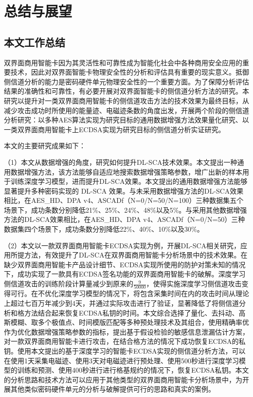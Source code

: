 \chapter{总结与展望}\label{chap:conclusion}{
	\section{本文工作总结}
	双界面商用智能卡因为其灵活性和可靠性成为智能化社会中各种商用安全应用的重要技术，因此对双界面智能卡物理安全性的分析和评估具有重要的现实意义。抵御侧信道分析的能力是密码硬件单元物理安全性的一个重要方面。为了保障分析评估结果的准确性和可靠性，有必要开展对双界面智能卡的侧信道分析方法的研究。本研究以提升对一类双界面商用智能卡的侧信道攻击方法的技术效果为最终目标，从减少攻击成功时所使用的能量迹、电磁迹条数的角度出发，开展两个阶段的侧信道分析研究：以多种AES算法实现为研究目标的通用数据增强方法效果量化研究、以一类双界面商用智能卡上ECDSA实现为研究目标的侧信道分析实证研究。
	
	本文的主要研究成果如下：
	
	（1）本文从数据增强的角度，研究如何提升DL-SCA技术效果。本文提出一种通用数据增强方法，该方法能够自适应地搜索数据增强策略参数，增广出新的样本用于训练深度学习模型，进而提升DL-SCA效果。本文提出的通用数据增强方法能够显著提升多种密码实现的 DL-SCA 效果。与未采用数据增强方法的DL-SCA效果相比，在AES\_HD、DPA v4、ASCADf（N=0/N=50/N=100）三种数据集五个场景下，成功条数分别降低21\%、25\%、24\%、48\%以及5\%。与采用其他数据增强方法的DL-SCA效果相比，在AES\_HD、DPA v4、ASCADf（N=0/N=50）三种数据集四个场景下，成功条数分别降低22\%、40\%、10\%以及30\%。
	
	（2）本文以一款双界面商用智能卡ECDSA实现为例，开展DL-SCA相关研究，应用所提方法，有效提升了DL-SCA在双界面商用智能卡分析场景中的技术效果。在缺少双界面商用智能卡产品设计细节、ECDSA实现所使用的防护对策未知的情况下，成功实现了一款具有ECDSA签名功能的双界面商用智能卡的破解。深度学习侧信道攻击的训练阶段计算量减少到原来的$\frac{9}{50000}$，使得实施深度学习侧信道攻击变得可行。在不优化深度学习模型的情况下，将包含采集时间在内的攻击时间从理论上超过七百万年减少到4天，并通过实际攻击进行了验证，显著降低了将侧信道分析和格方法结合起来恢复ECDSA私钥的时间。本文综合选择了量化、去抖动、高斯模糊、取多个极值点、时间模版匹配等多种预处理技术及其组合，使用精确率优作为优化数据增强策略参数的指标，提出基于假设检验的敏感信息泄漏估计方案，对一款双界面商用智能卡进行攻击，在结合格方法的情况下成功恢复ECDSA的私钥。使用本文提出的基于深度学习的智能卡ECDSA实现的侧信道分析方法，可以在使用1天采集电磁迹、使用3天对电磁迹进行预处理、使用500秒进行深度学习模型的训练和预测、使用400秒进行进行格基规约的情况下，恢复ECDSA私钥。本文的分析思路和技术方法可以应用于其他类型的双界面商用智能卡分析场景中，为开展其他类似密码硬件单元的分析与破解提供可行的思路和真实的案例。
}
